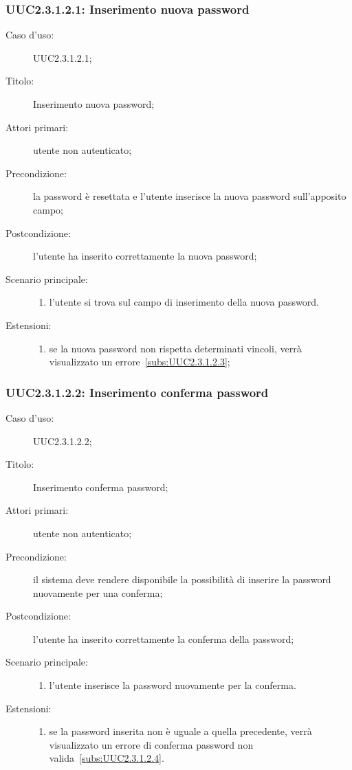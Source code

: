 \documentclass[../../../analisi-dei-requisiti.tex]{subfiles}
\begin{document}
\subsubsection{UUC2.3.1.2.1: Inserimento nuova password}%
\label{subs:UUC2.3.1.2.1}
\begin{description}
  \item[Caso d’uso:] UUC2.3.1.2.1;
  \item[Titolo:] Inserimento nuova password;
  \item[Attori primari:] utente non autenticato;
  \item[Precondizione:] la password è resettata e l'utente inserisce la nuova password sull'apposito campo;
  \item[Postcondizione:] l'utente ha inserito correttamente la nuova password;
  \item[Scenario principale:]
        \begin{enumerate}
          \item l'utente si trova sul campo di inserimento della nuova password.
        \end{enumerate}
  \item[Estensioni:]
        \begin{enumerate}
          \item se la nuova password non rispetta determinati vincoli, verrà visualizzato un errore~\ref{subs:UUC2.3.1.2.3};
        \end{enumerate}
\end{description}

\subsubsection{UUC2.3.1.2.2: Inserimento conferma password}%
\label{subs:UUC2.3.1.2.2}
\begin{description}
  \item[Caso d’uso:] UUC2.3.1.2.2;
  \item[Titolo:] Inserimento conferma password;
  \item[Attori primari:] utente non autenticato;
  \item[Precondizione:] il sistema deve rendere disponibile la possibilità di inserire la password nuovamente per una conferma;
  \item[Postcondizione:] l'utente ha inserito correttamente la conferma della password;
  \item[Scenario principale:]
        \begin{enumerate}
          \item l'utente inserisce la password nuovamente per la conferma.
        \end{enumerate}
  \item[Estensioni:]
        \begin{enumerate}
          \item se la password inserita non è uguale a quella precedente, verrà visualizzato un errore di conferma password non valida~\ref{subs:UUC2.3.1.2.4}.
        \end{enumerate}
\end{description}
\end{document}
